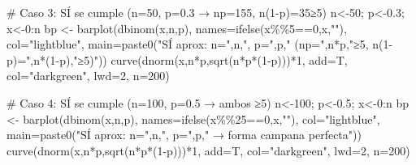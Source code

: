 \documentclass[
  letterpaper,
  DIV=11,
  numbers=noendperiod]{scrartcl}
\newenvironment{Shaded}{\begin{snugshade}}{\end{snugshade}}
\newcommand{\AttributeTok}[1]{\textcolor[rgb]{0.40,0.45,0.13}{#1}}
\newcommand{\CommentTok}[1]{\textcolor[rgb]{0.37,0.37,0.37}{#1}}
\newcommand{\DecValTok}[1]{\textcolor[rgb]{0.68,0.00,0.00}{#1}}
\newcommand{\FloatTok}[1]{\textcolor[rgb]{0.68,0.00,0.00}{#1}}
\newcommand{\FunctionTok}[1]{\textcolor[rgb]{0.28,0.35,0.67}{#1}}
\newcommand{\NormalTok}[1]{\textcolor[rgb]{0.00,0.23,0.31}{#1}}
\newcommand{\OtherTok}[1]{\textcolor[rgb]{0.00,0.23,0.31}{#1}}
\newcommand{\SpecialCharTok}[1]{\textcolor[rgb]{0.37,0.37,0.37}{#1}}
\newcommand{\StringTok}[1]{\textcolor[rgb]{0.13,0.47,0.30}{#1}}
\begin{document}
\begin{Shaded}
\begin{Highlighting}[]
\CommentTok{\# Caso 3: SÍ se cumple (n=50, p=0.3 → np=155, n(1{-}p)=35≥5)}
\NormalTok{n}\OtherTok{\textless{}{-}}\DecValTok{50}\NormalTok{; p}\OtherTok{\textless{}{-}}\FloatTok{0.3}\NormalTok{; x}\OtherTok{\textless{}{-}}\DecValTok{0}\SpecialCharTok{:}\NormalTok{n}
\NormalTok{bp }\OtherTok{\textless{}{-}} \FunctionTok{barplot}\NormalTok{(}\FunctionTok{dbinom}\NormalTok{(x,n,p), }\AttributeTok{names=}\FunctionTok{ifelse}\NormalTok{(x}\SpecialCharTok{\%\%}\DecValTok{5}\SpecialCharTok{==}\DecValTok{0}\NormalTok{,x,}\StringTok{""}\NormalTok{), }\AttributeTok{col=}\StringTok{"lightblue"}\NormalTok{,}
        \AttributeTok{main=}\FunctionTok{paste0}\NormalTok{(}\StringTok{"SÍ aprox: n="}\NormalTok{,n,}\StringTok{", p="}\NormalTok{,p,}\StringTok{" (np="}\NormalTok{,n}\SpecialCharTok{*}\NormalTok{p,}\StringTok{"≥5, n(1{-}p)="}\NormalTok{,n}\SpecialCharTok{*}\NormalTok{(}\DecValTok{1}\SpecialCharTok{{-}}\NormalTok{p),}\StringTok{"≥5)"}\NormalTok{))}
\FunctionTok{curve}\NormalTok{(}\FunctionTok{dnorm}\NormalTok{(x,n}\SpecialCharTok{*}\NormalTok{p,}\FunctionTok{sqrt}\NormalTok{(n}\SpecialCharTok{*}\NormalTok{p}\SpecialCharTok{*}\NormalTok{(}\DecValTok{1}\SpecialCharTok{{-}}\NormalTok{p)))}\SpecialCharTok{*}\DecValTok{1}\NormalTok{, }\AttributeTok{add=}\NormalTok{T, }\AttributeTok{col=}\StringTok{"darkgreen"}\NormalTok{, }\AttributeTok{lwd=}\DecValTok{2}\NormalTok{, }\AttributeTok{n=}\DecValTok{200}\NormalTok{)}

\CommentTok{\# Caso 4: SÍ se cumple (n=100, p=0.5 → ambos ≥5)}
\NormalTok{n}\OtherTok{\textless{}{-}}\DecValTok{100}\NormalTok{; p}\OtherTok{\textless{}{-}}\FloatTok{0.5}\NormalTok{; x}\OtherTok{\textless{}{-}}\DecValTok{0}\SpecialCharTok{:}\NormalTok{n}
\NormalTok{bp }\OtherTok{\textless{}{-}} \FunctionTok{barplot}\NormalTok{(}\FunctionTok{dbinom}\NormalTok{(x,n,p), }\AttributeTok{names=}\FunctionTok{ifelse}\NormalTok{(x}\SpecialCharTok{\%\%}\DecValTok{25}\SpecialCharTok{==}\DecValTok{0}\NormalTok{,x,}\StringTok{""}\NormalTok{), }\AttributeTok{col=}\StringTok{"lightblue"}\NormalTok{,}
        \AttributeTok{main=}\FunctionTok{paste0}\NormalTok{(}\StringTok{"SÍ aprox: n="}\NormalTok{,n,}\StringTok{", p="}\NormalTok{,p,}\StringTok{" → forma campana perfecta"}\NormalTok{))}
\FunctionTok{curve}\NormalTok{(}\FunctionTok{dnorm}\NormalTok{(x,n}\SpecialCharTok{*}\NormalTok{p,}\FunctionTok{sqrt}\NormalTok{(n}\SpecialCharTok{*}\NormalTok{p}\SpecialCharTok{*}\NormalTok{(}\DecValTok{1}\SpecialCharTok{{-}}\NormalTok{p)))}\SpecialCharTok{*}\DecValTok{1}\NormalTok{, }\AttributeTok{add=}\NormalTok{T, }\AttributeTok{col=}\StringTok{"darkgreen"}\NormalTok{, }\AttributeTok{lwd=}\DecValTok{2}\NormalTok{, }\AttributeTok{n=}\DecValTok{200}\NormalTok{)}
\end{Highlighting}
\end{Shaded}
\end{document}
